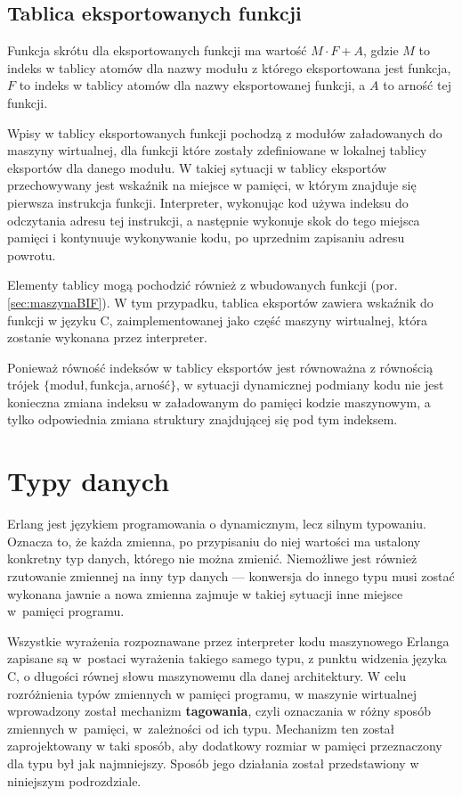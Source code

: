 \subsection{Tablica eksportowanych funkcji}
\label{sub:maszynaTablicaEksportow}

Funkcja skrótu dla eksportowanych funkcji ma wartość $M \cdot F+A$, gdzie $M$ to indeks w tablicy atomów dla nazwy modułu z którego eksportowana jest funkcja, $F$ to indeks w tablicy atomów dla nazwy eksportowanej funkcji, a $A$ to arność tej funkcji.

Wpisy w tablicy eksportowanych funkcji pochodzą z modułów załadowanych do maszyny wirtualnej, dla funkcji które zostały zdefiniowane w lokalnej tablicy eksportów dla danego modułu. W takiej sytuacji w tablicy eksportów przechowywany jest wskaźnik na miejsce w pamięci, w którym znajduje się pierwsza instrukcja funkcji. Interpreter, wykonując kod używa indeksu do odczytania adresu tej instrukcji, a następnie wykonuje skok do tego miejsca pamięci i kontynuuje wykonywanie kodu, po uprzednim zapisaniu adresu powrotu.

Elementy tablicy mogą pochodzić również z wbudowanych funkcji (por. \ref{sec:maszynaBIF}). W tym przypadku, tablica eksportów zawiera wskaźnik do funkcji w języku C, zaimplementowanej jako część maszyny wirtualnej, która zostanie wykonana przez interpreter.

Ponieważ równość indeksów w tablicy eksportów jest równoważna z równością trójek $\lbrace\text{moduł},\text{funkcja},\text{arność}\rbrace$, w sytuacji dynamicznej podmiany kodu nie jest konieczna zmiana indeksu w załadowanym do pamięci kodzie maszynowym, a tylko odpowiednia zmiana struktury znajdującej się pod tym indeksem.

\section{Typy danych}
\label{sec:maszynaTypy}

Erlang jest językiem programowania o dynamicznym, lecz silnym typowaniu. Oznacza to, że każda zmienna, po przypisaniu do niej wartości ma ustalony konkretny typ danych, którego nie można zmienić. Niemożliwe jest również rzutowanie zmiennej na inny typ danych --- konwersja do innego typu musi zostać wykonana jawnie a nowa zmienna zajmuje w takiej sytuacji inne miejsce w~pamięci programu.

Wszystkie wyrażenia rozpoznawane przez interpreter kodu maszynowego Erlanga zapisane są w~postaci wyrażenia takiego samego typu, z punktu widzenia języka C, o długości równej słowu maszynowemu dla danej architektury.
W celu rozróżnienia typów zmiennych w pamięci programu, w maszynie wirtualnej wprowadzony został mechanizm \textbf{tagowania}, czyli oznaczania w różny sposób zmiennych w~pamięci, w~zależności od ich typu. Mechanizm ten został zaprojektowany w taki sposób, aby dodatkowy rozmiar w pamięci przeznaczony dla typu był jak najmniejszy. Sposób jego działania został przedstawiony w niniejszym podrozdziale.

